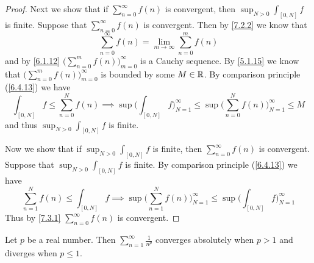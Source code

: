 \begin{proof}
  Next we show that if \(\sum_{n = 0}^\infty f(n)\) is convergent, then \(\sup_{N > 0} \int_{[0, N]} f\) is finite.
  Suppose that \(\sum_{n = 0}^\infty f(n)\) is convergent.
  Then by \cref{7.2.2} we know that
  \[
    \sum_{n = 0}^\infty f(n) = \lim_{m \to \infty} \sum_{n = 0}^m f(n)
  \]
  and by \cref{6.1.12} \(\big(\sum_{n = 0}^m f(n)\big)_{m = 0}^\infty\) is a Cauchy sequence.
  By \cref{5.1.15} we know that \(\big(\sum_{n = 0}^m f(n)\big)_{m = 0}^\infty\) is bounded by some \(M \in \mathbb{R}\).
  By comparison principle (\cref{6.4.13}) we have
  \[
    \int_{[0, N]} f \leq \sum_{n = 0}^N f(n) \implies \sup\bigg(\int_{[0, N]} f\bigg)_{N = 1}^\infty \leq \sup\bigg(\sum_{n = 0}^N f(n)\bigg)_{N = 1}^\infty \leq M
  \]
  and thus \(\sup_{N > 0} \int_{[0, N]} f\) is finite.

  Now we show that if \(\sup_{N > 0} \int_{[0, N]} f\) is finite, then \(\sum_{n = 0}^\infty f(n)\) is convergent.
  Suppose that \(\sup_{N > 0} \int_{[0, N]} f\) is finite.
  By comparison principle (\cref{6.4.13}) we have
  \[
    \sum_{n = 1}^N f(n) \leq \int_{[0, N]} f \implies \sup\bigg(\sum_{n = 1}^N f(n)\bigg)_{N = 1}^\infty \leq \sup\bigg(\int_{[0, N]} f\bigg)_{N = 1}^\infty
  \]
  Thus by \cref{7.3.1} \(\sum_{n = 0}^\infty f(n)\) is convergent.
\end{proof}

\begin{cor}\label{11.6.5}
  Let \(p\) be a real number.
  Then \(\sum_{n = 1}^\infty \frac{1}{n^p}\) converges absolutely when \(p > 1\) and diverges when \(p \leq 1\).
\end{cor}

